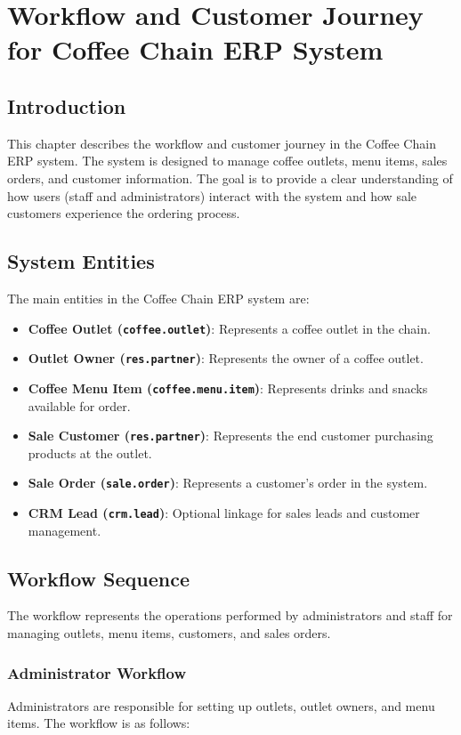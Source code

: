 \chapter{Workflow and Customer Journey for Coffee Chain ERP System}

\section*{Introduction}
This chapter describes the workflow and customer journey in the Coffee Chain ERP system. The system is designed to manage coffee outlets, menu items, sales orders, and customer information. The goal is to provide a clear understanding of how users (staff and administrators) interact with the system and how sale customers experience the ordering process.

\section*{System Entities}
The main entities in the Coffee Chain ERP system are:

\begin{itemize}
    \item \textbf{Coffee Outlet (\texttt{coffee.outlet})}: Represents a coffee outlet in the chain.
    \item \textbf{Outlet Owner (\texttt{res.partner})}: Represents the owner of a coffee outlet.
    \item \textbf{Coffee Menu Item (\texttt{coffee.menu.item})}: Represents drinks and snacks available for order.
    \item \textbf{Sale Customer (\texttt{res.partner})}: Represents the end customer purchasing products at the outlet.
    \item \textbf{Sale Order (\texttt{sale.order})}: Represents a customer's order in the system.
    \item \textbf{CRM Lead (\texttt{crm.lead})}: Optional linkage for sales leads and customer management.
\end{itemize}

\section*{Workflow Sequence}
The workflow represents the operations performed by administrators and staff for managing outlets, menu items, customers, and sales orders.

\subsection*{Administrator Workflow}
Administrators are responsible for setting up outlets, outlet owners, and menu items. The workflow is as follows:

